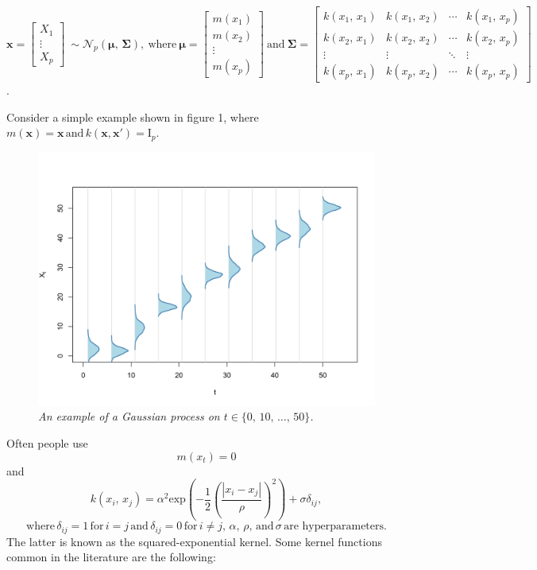 \documentclass[a4paper, 10pt]{article}
\begin{document}
\begin{flushleft}
   $\mathbf{x} =
   \begin{bmatrix}
      X_{1} \\
      \vdots \\
      X_{p}
   \end{bmatrix}
   \:
   \sim \mathcal{N}_{p}(\boldsymbol{\mu}, \, \boldsymbol{\Sigma}),
   \:
   \text{where}
   \:
   \boldsymbol{\mu} = 
   \begin{bmatrix}
      m(x_{1}) \\
      m(x_{2}) \\
      \vdots \\
      m(x_{p})
   \end{bmatrix}  
   \: 
   \text{and}
   \:
   \boldsymbol{\Sigma} = 
   \begin{bmatrix}
      k(x_{1}, \, x_{1}) & k(x_{1}, \, x_{2}) & \cdots & k(x_{1}, \, x_{p}) \\
      k(x_{2}, \, x_{1}) & k(x_{2}, \, x_{2}) & \cdots & k(x_{2}, \, x_{p}) \\
      \vdots & \vdots & \ddots & \vdots \\
      k(x_{p}, \, x_{1}) & k(x_{p}, \, x_{2}) & \cdots & k(x_{p}, \, x_{p})
   \end{bmatrix}$.
   
   \vspace{1em}

   Consider a simple example shown in figure 1, where $m(\mathbf{x}) = \mathbf{x} \, \text{and} \, k(\mathbf{x}, \mathbf{x}') = \text{I}_{p}$. 

   \begin{figure}[H]
      \centering
      \includegraphics[width=0.48\linewidth]{../img/gp.png}
      \caption{\textit{An example of a Gaussian process on $t \in \{0, \, 10, \, \ldots, \, 50\}$.}}
   \end{figure}
   
   Often people use 
   $$m(x_{t}) = 0$$ 
   and 
   $$k(x_{i}, \, x_{j}) = \alpha^{2} \text{exp}(- \frac{1}{2} (\frac{|x_i - x_j|}{\rho})^2) + \sigma\delta_{ij},$$ 
   $$\text{where} \, \delta_{ij} = 1 \, \text{for} \, i = j \, \text{and} \, \delta_{ij} = 0 \, \text{for} \, i \neq j, \, \alpha, \, \rho, \, \text{and} \, \sigma \, \text{are hyperparameters}.$$ 
   The latter is known as the squared-exponential kernel. Some kernel functions common in the literature are the following:


\end{flushleft}
\end{document}
